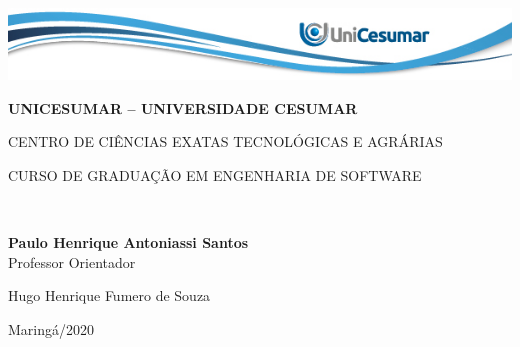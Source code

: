 \begin{center}
    \includegraphics[width=1\textwidth]{images/header.png}
    \makeatletter
    
    \textbf {UNICESUMAR – UNIVERSIDADE CESUMAR }
    \par
    CENTRO DE CIÊNCIAS EXATAS TECNOLÓGICAS E AGRÁRIAS\par
    CURSO DE GRADUAÇÃO EM ENGENHARIA DE SOFTWARE
    \par
    
    \vspace{3cm}
    \Large
    \textbf{ \@title} \\
    \normalsize
    \par
    \vspace{2cm}
    \textbf{Paulo Henrique Antoniassi Santos} \\
    
    \vspace{3cm}
    Professor Orientador\par
    Hugo Henrique Fumero de Souza
    
    
    \vspace{3cm}
    Maringá/2020
    
    \makeatother
\end{center}
\normalsize

\newpage


